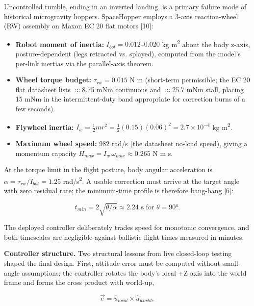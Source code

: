 \documentclass[conference]{IEEEtran}
\begin{document}
Uncontrolled tumble, ending in an inverted landing, is a primary failure mode of historical microgravity hoppers. SpaceHopper employs a 3-axis reaction-wheel (RW) assembly on Maxon EC 20 flat motors [10]:

\begin{itemize}
\item \textbf{Robot moment of inertia:} $I_{bot} = 0.012$--$0.020$ kg\,\textperiodcentered\,m\textsuperscript{2} about the body z-axis, posture-dependent (legs retracted vs. splayed), computed from the model's per-link inertias via the parallel-axis theorem.
\item \textbf{Wheel torque budget:} $\tau_{rw} = 0.015$ N\,\textperiodcentered\,m (short-term permissible; the EC 20 flat datasheet lists \ensuremath{\approx}8.75 mNm continuous and \ensuremath{\approx}25.7 mNm stall, placing 15 mNm in the intermittent-duty band appropriate for correction burns of a few seconds).
\item \textbf{Flywheel inertia:} $I_w = \frac{1}{2}mr^2 = \frac{1}{2}(0.15)(0.06)^2 = 2.7\times10^{-4}$ kg\,\textperiodcentered\,m\textsuperscript{2}.
\item \textbf{Maximum wheel speed:} 982 rad/s (the datasheet no-load speed), giving a momentum capacity $H_{max} = I_w\,\omega_{max} \approx 0.265$ N\,\textperiodcentered\,m\,\textperiodcentered\,s.
\end{itemize}

At the torque limit in the flight posture, body angular acceleration is $\alpha = \tau_{rw}/I_{bot} = 1.25$ rad/s\textsuperscript{2}. A usable correction must arrive at the target angle with zero residual rate; the minimum-time profile is therefore bang-bang [6]:

\begin{equation*}t_{min} = 2\sqrt{\theta/\alpha} \approx 2.24 \text{ s for } \theta = 90°.\end{equation*}

The deployed controller deliberately trades speed for monotonic convergence, and both timescales are negligible against ballistic flight times measured in minutes.

\textbf{Controller structure.} Two structural lessons from live closed-loop testing shaped the final design. First, attitude error must be computed without small-angle assumptions: the controller rotates the body's local +Z axis into the world frame and forms the cross product with world-up,

\begin{equation*}\vec{e} = \hat{u}_{local} \times \hat{u}_{world},\end{equation*}
\end{document}
